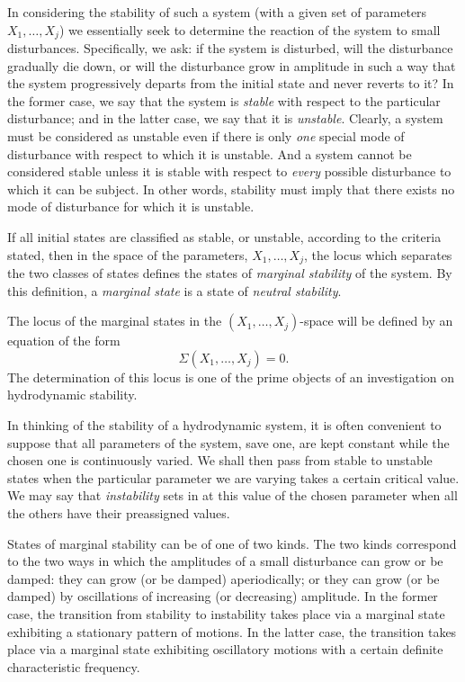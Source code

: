 In considering the stability of such a system (with a given set of
parameters $X_1, \ldots, X_j$) we essentially seek to determine the reaction of
the system to small disturbances.  Specifically, we ask: if the system is
disturbed, will the disturbance gradually die down, or will the disturbance
grow in amplitude in such a way that the system progressively departs
from the initial state and never reverts to it?  In the former case, we say
that the system is \emph{stable} with respect to the particular disturbance; and
in the latter case, we say that it is \emph{unstable}.  Clearly, a system must be
considered as unstable even if there is only \emph{one} special mode of disturbance with respect to which it is unstable.  And a system cannot be
considered stable unless it is stable with respect to \emph{every} possible disturbance to which it can be subject.  In other words, stability must imply
that there exists no mode of disturbance for which it is unstable.

If all initial states are classified as stable, or unstable, according to
the criteria stated, then in the space of the parameters, $X_1, \ldots, X_j$, the
locus which separates the two classes of states defines the states of
\emph{marginal stability} of the system.  By this definition, a \emph{marginal state} is
a state of \emph{neutral stability}.

The locus of the marginal states in the $(X_1, \ldots, X_j)$-space will be defined
by an equation of the form
\begin{equation}
\label{eq:1-1}
\Sigma(X_1, \ldots, X_j) = 0.
\end{equation}
The determination of this locus is one of the prime objects of an investigation on hydrodynamic stability.

In thinking of the stability of a hydrodynamic system, it is often
convenient to suppose that all parameters of the system, save one, are
kept constant while the chosen one is continuously varied.  We shall
then pass from stable to unstable states when the particular parameter
we are varying takes a certain critical value.  We may say that \emph{instability}
sets in at this value of the chosen parameter when all the others have
their preassigned values.

States of marginal stability can be of one of two kinds.  The two kinds
correspond to the two ways in which the amplitudes of a small disturbance can grow or be damped: they can grow (or be damped) aperiodically; or they can grow (or be damped) by oscillations of increasing (or
decreasing) amplitude.  In the former case, the transition from stability
to instability takes place via a marginal state exhibiting a stationary
pattern of motions.  In the latter case, the transition takes place via a
marginal state exhibiting oscillatory motions with a certain definite
characteristic frequency.

